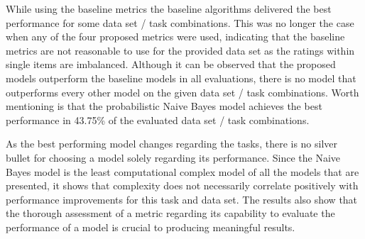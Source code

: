 While using the baseline metrics the baseline algorithms delivered the best performance for some data set / task combinations. This was no longer the case when any of the four proposed metrics were used, indicating that the baseline metrics are not reasonable to use for the provided data set as the ratings within single items are imbalanced. Although it can be observed that the proposed models outperform the baseline models in all evaluations, there is no model that outperforms every other model on the given data set / task combinations. Worth mentioning is that the probabilistic Naive Bayes model achieves the best performance in 43.75\% of the evaluated data set / task combinations. 

As the best performing model changes regarding the tasks, there is no silver bullet for choosing a model solely regarding its performance. 
Since the Naive Bayes model is the least computational complex model of all the models that are presented, it shows that complexity does not necessarily correlate positively with performance improvements for this task and data set.
The results also show that the thorough assessment of a metric regarding its capability to evaluate the performance of a model is crucial to producing meaningful results.


